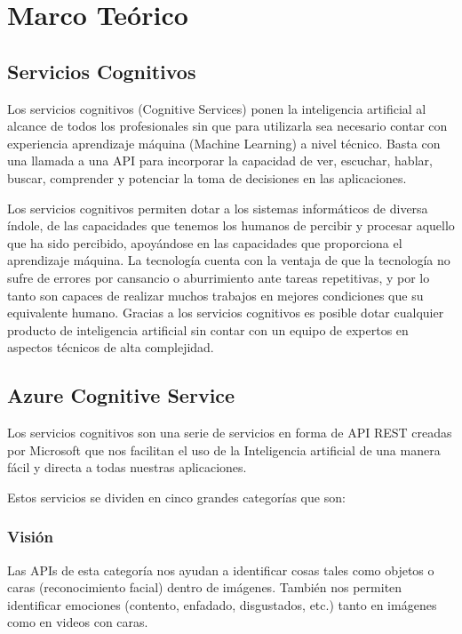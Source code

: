 \section{Marco Teórico}

\subsection{Servicios Cognitivos}

Los servicios cognitivos (Cognitive Services) ponen la inteligencia artificial al
alcance de todos los profesionales sin que para utilizarla sea necesario contar con
experiencia aprendizaje máquina (Machine Learning) a nivel técnico. Basta con una llamada
a una API para incorporar la capacidad de ver, escuchar, hablar, buscar, comprender y
potenciar la toma de decisiones en las aplicaciones.

Los servicios cognitivos permiten dotar a los sistemas informáticos de diversa índole, de las
capacidades que tenemos los humanos de percibir y procesar aquello que ha sido percibido,
apoyándose en las capacidades que proporciona el aprendizaje máquina. La tecnología cuenta con
la ventaja de que la tecnología no sufre de errores por cansancio o aburrimiento ante tareas
repetitivas, y por lo tanto son capaces de realizar muchos trabajos en mejores condiciones que
su equivalente humano. Gracias a los servicios cognitivos es posible dotar cualquier producto
de inteligencia artificial sin contar con un equipo de expertos en aspectos técnicos de alta
complejidad.

\subsection{Azure Cognitive Service}
Los servicios cognitivos son una serie de servicios en forma de API REST creadas por Microsoft que nos facilitan el uso de la Inteligencia artificial de una manera fácil y directa a todas nuestras aplicaciones. %

Estos servicios se dividen en cinco grandes categorías que son:

\subsubsection{Visión} Las APIs de esta categoría nos ayudan a identificar cosas tales como
objetos o caras (reconocimiento facial) dentro de imágenes. También nos permiten identificar
emociones (contento, enfadado, disgustados, etc.) tanto en imágenes como en videos con caras.

